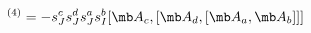 \begin{equation}
[L_3^3L_1]^{(4)}=-s_{J}^{c} s_{J}^{d}  s_{J}^{a} s_I^b [{\mb A}_c,[{\mb A}_d,[{\mb A}_a,{\mb A}_b]]]
\end{equation}

